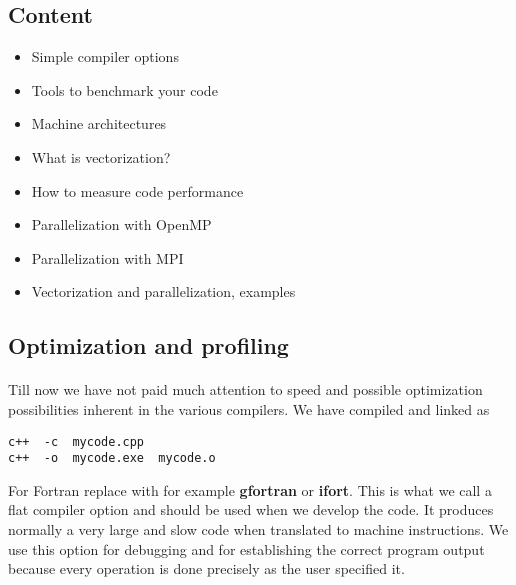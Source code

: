 \documentclass[%
oneside,                 %
final,                   %
10pt]{article}
\begin{document}
\subsection*{Content}
\begin{itemize}
\item Simple compiler options 

\item Tools to benchmark your code

\item Machine architectures

\item What is vectorization?

\item How to measure code performance

\item Parallelization with OpenMP

\item Parallelization with MPI

\item Vectorization and parallelization, examples
\end{itemize}

\noindent
\subsection*{Optimization and profiling}

\paragraph{}

Till now we have not paid much attention to speed and possible optimization possibilities
inherent in the various compilers. We have compiled and linked as



\begin{verbatim}
c++  -c  mycode.cpp
c++  -o  mycode.exe  mycode.o

\end{verbatim}

For Fortran replace with for example \textbf{gfortran} or \textbf{ifort}.
This is what we call a flat compiler option and should be used when we develop the code.
It produces normally a very large and slow code when translated to machine instructions.
We use this option for debugging and for establishing the correct program output because
every operation is done precisely as the user specified it.
\end{document}

